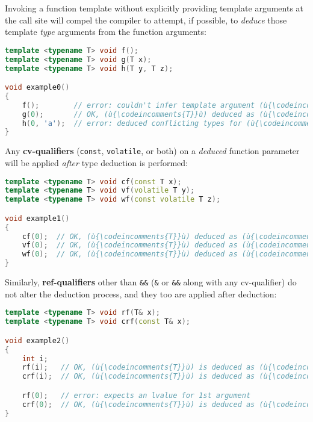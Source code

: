 Invoking a function template without explicitly providing template
arguments at the call site will compel the compiler to attempt, if
possible, to \emph{deduce} those template \emph{type} arguments from the
function arguments:

\begin{lstlisting}[language=C++]
template <typename T> void f();
template <typename T> void g(T x);
template <typename T> void h(T y, T z);

void example0()
{
    f();        // error: couldn't infer template argument (ù{\codeincomments{T}}ù)
    g(0);       // OK, (ù{\codeincomments{T}}ù) deduced as (ù{\codeincomments{int}}ù) from literal (ù{\codeincomments{0}}ù) -- (ù{\codeincomments{x}}ù) is an (ù{\codeincomments{int}}ù).
    h(0, 'a');  // error: deduced conflicting types for (ù{\codeincomments{T}}ù) ((ù{\codeincomments{int}}ù) vs. (ù{\codeincomments{char}}ù))
}
\end{lstlisting}

\noindent Any \textbf{cv-qualifiers} (\texttt{const}, \texttt{volatile}, or both)
on a \emph{deduced} function parameter will be applied \emph{after} type
deduction is performed:

\begin{lstlisting}[language=C++]
template <typename T> void cf(const T x);
template <typename T> void vf(volatile T y);
template <typename T> void wf(const volatile T z);

void example1()
{
    cf(0);  // OK, (ù{\codeincomments{T}}ù) deduced as (ù{\codeincomments{int}}ù) -- (ù{\codeincomments{x}}ù) is a (ù{\codeincomments{const int}}ù).
    vf(0);  // OK, (ù{\codeincomments{T}}ù) deduced as (ù{\codeincomments{int}}ù) -- (ù{\codeincomments{y}}ù) is a (ù{\codeincomments{volatile int}}ù).
    wf(0);  // OK, (ù{\codeincomments{T}}ù) deduced as (ù{\codeincomments{int}}ù) -- (ù{\codeincomments{z}}ù) is a (ù{\codeincomments{const}}ù) (ù{\codeincomments{volatile}}ù) (ù{\codeincomments{int}}ù).
}
\end{lstlisting}

\noindent Similarly, \textbf{ref-qualifiers} other than \texttt{\&\&}
(\texttt{\&} or \texttt{\&\&} along with any cv-qualifier) do not
alter the deduction process, and they too are applied after deduction:

\begin{lstlisting}[language=C++]
template <typename T> void rf(T& x);
template <typename T> void crf(const T& x);

void example2()
{
    int i;
    rf(i);   // OK, (ù{\codeincomments{T}}ù) is deduced as (ù{\codeincomments{int}}ù) -- (ù{\codeincomments{x}}ù) is an (ù{\codeincomments{int\&}}ù).
    crf(i);  // OK, (ù{\codeincomments{T}}ù) is deduced as (ù{\codeincomments{int}}ù) -- (ù{\codeincomments{x}}ù) is a (ù{\codeincomments{const int\&}}ù).

    rf(0);   // error: expects an lvalue for 1st argument
    crf(0);  // OK, (ù{\codeincomments{T}}ù) is deduced as (ù{\codeincomments{int}}ù) -- (ù{\codeincomments{x}}ù) is a (ù{\codeincomments{const int\&}}ù).
}
\end{lstlisting}

